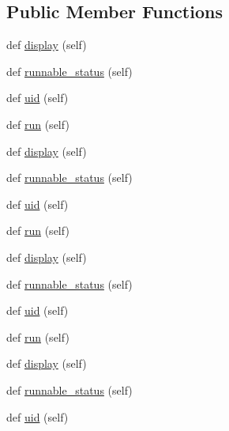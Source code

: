 \subsection*{Public Member Functions}
\begin{DoxyCompactItemize}
\item 
def \hyperlink{classwaflib_1_1_tools_1_1c__config_1_1cfgtask_aecf986e3bdcfc517a0cd9e4b776d8366}{display} (self)
\item 
def \hyperlink{classwaflib_1_1_tools_1_1c__config_1_1cfgtask_af809af735ae4d53f098dff58980dff43}{runnable\+\_\+status} (self)
\item 
def \hyperlink{classwaflib_1_1_tools_1_1c__config_1_1cfgtask_a97e3028401d435571c7ea130eaff5162}{uid} (self)
\item 
def \hyperlink{classwaflib_1_1_tools_1_1c__config_1_1cfgtask_a5621ce914bfed0045cc99f93cf7381af}{run} (self)
\item 
def \hyperlink{classwaflib_1_1_tools_1_1c__config_1_1cfgtask_aecf986e3bdcfc517a0cd9e4b776d8366}{display} (self)
\item 
def \hyperlink{classwaflib_1_1_tools_1_1c__config_1_1cfgtask_af809af735ae4d53f098dff58980dff43}{runnable\+\_\+status} (self)
\item 
def \hyperlink{classwaflib_1_1_tools_1_1c__config_1_1cfgtask_a97e3028401d435571c7ea130eaff5162}{uid} (self)
\item 
def \hyperlink{classwaflib_1_1_tools_1_1c__config_1_1cfgtask_a5621ce914bfed0045cc99f93cf7381af}{run} (self)
\item 
def \hyperlink{classwaflib_1_1_tools_1_1c__config_1_1cfgtask_aecf986e3bdcfc517a0cd9e4b776d8366}{display} (self)
\item 
def \hyperlink{classwaflib_1_1_tools_1_1c__config_1_1cfgtask_af809af735ae4d53f098dff58980dff43}{runnable\+\_\+status} (self)
\item 
def \hyperlink{classwaflib_1_1_tools_1_1c__config_1_1cfgtask_a97e3028401d435571c7ea130eaff5162}{uid} (self)
\item 
def \hyperlink{classwaflib_1_1_tools_1_1c__config_1_1cfgtask_a5621ce914bfed0045cc99f93cf7381af}{run} (self)
\item 
def \hyperlink{classwaflib_1_1_tools_1_1c__config_1_1cfgtask_aecf986e3bdcfc517a0cd9e4b776d8366}{display} (self)
\item 
def \hyperlink{classwaflib_1_1_tools_1_1c__config_1_1cfgtask_af809af735ae4d53f098dff58980dff43}{runnable\+\_\+status} (self)
\item 
def \hyperlink{classwaflib_1_1_tools_1_1c__config_1_1cfgtask_a97e3028401d435571c7ea130eaff5162}{uid} (self)

\end{DoxyCompactItemize}
